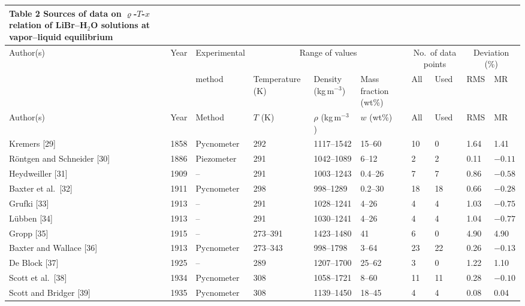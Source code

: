 \documentclass[11pt]{article}
\newcommand{\dens}{\varrho}
\newcommand{\wtpc}{wt\%}
\begin{document}
\begin{landscape}
\begin{longtable}{llllllllll}
\caption*{Table 2\\ Sources of data on $\dens$-$T$-$x$ relation of
          LiBr--H$_2$O solutions at vapor--liquid equilibrium} \\
\toprule
Author(s) & Year & Experimental
 & \multicolumn{3}{c}{Range of values}
 & \multicolumn{2}{c}{No.\ of data points}
 & \multicolumn{2}{c}{Deviation (\%)} \\
\cmidrule(lr){4-6}\cmidrule(lr){7-8}\cmidrule(lr){9-10}
 & & method & Temperature (K) & Density (kg\,m$^{-3}$)
 & Mass fraction (\wtpc) & All & Used & RMS & MR \\
\midrule
\endfirsthead
\toprule
Author(s) & Year & Method & $T$ (K) & $\rho$ (kg\,m$^{-3}$)
 & $w$ (\wtpc) & All & Used & RMS & MR \\
\midrule
\endhead
Kremers [29]                    & 1858 & Pycnometer     & 292      & 1117--1542 & 15--60  & 10  & 0   & 1.64 & 1.41 \\
R\"ontgen and Schneider [30]    & 1886 & Piezometer     & 291      & 1042--1089 & 6--12   & 2   & 2   & 0.11 & $-0.11$ \\
Heydweiller [31]                & 1909 & --             & 291      & 1003--1243 & 0.4--26 & 7   & 7   & 0.86 & $-0.58$ \\
Baxter et al.\ [32]             & 1911 & Pycnometer     & 298      & 998--1289  & 0.2--30 & 18  & 18  & 0.66 & $-0.28$ \\
Grufki [33]                     & 1913 & --             & 291      & 1028--1241 & 4--26   & 4   & 4   & 1.03 & $-0.75$ \\
L\"ubben [34]                   & 1913 & --             & 291      & 1030--1241 & 4--26   & 4   & 4   & 1.04 & $-0.77$ \\
Gropp [35]                      & 1915 & --             & 273--391 & 1423--1480 & 41      & 6   & 0   & 4.90 & 4.90 \\
Baxter and Wallace [36]         & 1913 & Pycnometer     & 273--343 & 998--1798  & 3--64   & 23  & 22  & 0.26 & $-0.13$ \\
De Block [37]                   & 1925 & --             & 289      & 1207--1700 & 25--62  & 3   & 0   & 1.22 & 1.10 \\
Scott et al.\ [38]              & 1934 & Pycnometer     & 308      & 1058--1721 & 8--60   & 11  & 11  & 0.28 & $-0.10$ \\
Scott and Bridger [39]          & 1935 & Pycnometer     & 308      & 1139--1450 & 18--45  & 4   & 4   & 0.08 & 0.04 \\

\end{longtable}
\end{landscape}
\end{document}
